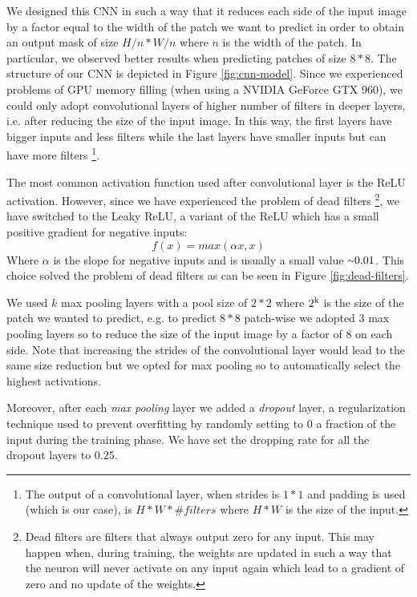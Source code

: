 \documentclass[10pt,conference,compsocconf]{IEEEtran}
\begin{document}
We designed this CNN in such a way that it reduces each side of the input image by a factor equal to the width of the patch we want to predict in order to obtain an output mask of size $H/n*W/n$ where $n$ is the width of the patch. In particular, we observed better results when predicting patches of size $8*8$. The structure of our CNN is depicted in Figure \ref{fig:cnn-model}. Since we experienced problems of GPU memory filling (when using a NVIDIA GeForce GTX 960), we could only adopt convolutional layers of higher number of filters in deeper layers, i.e. after reducing the size of the input image. In this way, the first layers have bigger inputs and less filters while the last layers have smaller inputs but can have more filters \footnote{The output of a convolutional layer, when strides is $1*1$ and padding is used (which is our case), is $H * W * \#filters$ where $H*W$ is the size of the input.}.

The most common activation function used after convolutional layer is the ReLU activation. However, since we have experienced the problem of dead filters \footnote{Dead filters are filters that always output zero for any input. This may happen when, during training, the weights are updated in such a way that the neuron will never activate on any input again which lead to a gradient of zero and no update of the weights.}, we have switched to the Leaky ReLU, a variant of the ReLU which has a small positive gradient for negative inputs:
$$f(x)=max(\alpha x, x)$$
Where $\alpha$ is the slope for negative inputs and is usually a small value ${\raise.17ex\hbox{$\scriptstyle\sim$}}0.01$.
This choice solved the problem of dead filters as can be seen in Figure \ref{fig:dead-filters}.

We used $k$ max pooling layers with a pool size of $2*2$ where $2\textsuperscript{k}$ is the size of the patch we wanted to predict, e.g. to predict $8*8$ patch-wise we adopted 3 max pooling layers so to reduce the size of the input image by a factor of 8 on each side. Note that increasing the strides of the convolutional layer would lead to the same size reduction but we opted for max pooling so to automatically select the highest activations.

Moreover, after each \textit{max pooling} layer we added a \textit{dropout} layer, a regularization technique used to prevent overfitting by randomly setting to 0 a fraction of the input during the training phase. We have set the dropping rate for all the dropout layers to $0.25$.
\end{document}
